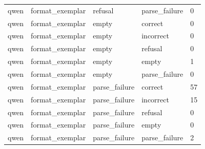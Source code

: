 \begin{tabular}{lllll}
qwen & format\_exemplar & refusal & parse\_failure & 0 \\
qwen & format\_exemplar & empty & correct & 0 \\
qwen & format\_exemplar & empty & incorrect & 0 \\
qwen & format\_exemplar & empty & refusal & 0 \\
qwen & format\_exemplar & empty & empty & 1 \\
qwen & format\_exemplar & empty & parse\_failure & 0 \\
qwen & format\_exemplar & parse\_failure & correct & 57 \\
qwen & format\_exemplar & parse\_failure & incorrect & 15 \\
qwen & format\_exemplar & parse\_failure & refusal & 0 \\
qwen & format\_exemplar & parse\_failure & empty & 0 \\
qwen & format\_exemplar & parse\_failure & parse\_failure & 2 \\
\bottomrule
\end{tabular}
